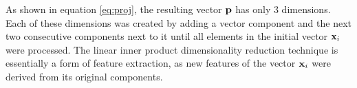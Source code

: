 As shown in equation \ref{eq:proj}, the resulting vector $\boldsymbol{\mathbf{p}}$ has only 3 dimensions. Each of these dimensions was created by adding a vector component and the next two consecutive components next to it until all elements in the initial vector $\boldsymbol{\mathbf{x}}_i$ were processed. The linear inner product dimensionality reduction technique is essentially a form of feature extraction, as new features of the vector $\boldsymbol{\mathbf{x}}_i$ were derived from its original components.